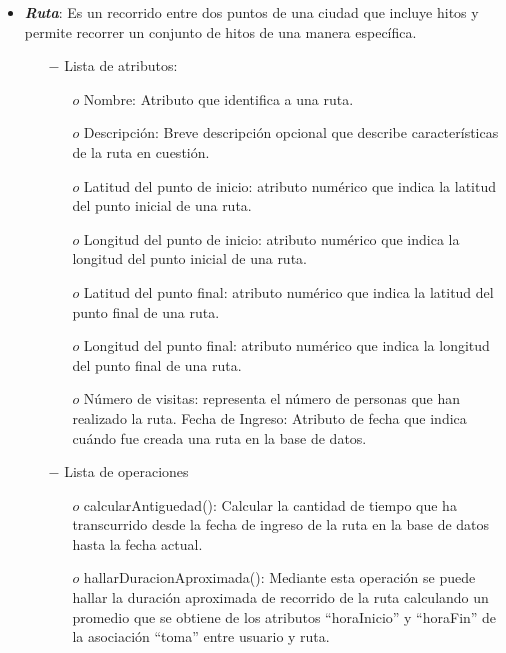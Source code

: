 \documentclass[a4paper]{article}
\begin{document}
\begin{itemize}
\item{
	\textbf{\textit{Ruta}}: Es un recorrido entre dos puntos de una ciudad que incluye hitos y permite recorrer un conjunto de hitos de una manera específica. 
  		
     \begin{itemize}   
  		\item[$-$] Lista de atributos:

	\begin{itemize}
		 
        
      \item[$o$] Nombre: Atributo que identifica a una ruta.
\item[$o$]Descripción: Breve descripción opcional que describe características de la ruta en cuestión.
\item[$o$]Latitud del punto de inicio: atributo numérico que indica la latitud del punto inicial de una ruta.
\item[$o$]Longitud del punto de inicio: atributo numérico que indica la longitud del punto inicial de una ruta.
\item[$o$]Latitud del punto final: atributo numérico que indica la latitud del punto final de una ruta.
\item[$o$]Longitud del punto final: atributo numérico que indica la longitud del punto final de una ruta.
\item[$o$]Número de visitas: representa el número de personas que han realizado la ruta.
Fecha de Ingreso: Atributo de fecha que indica cuándo fue creada una ruta en la base de datos.



	\end{itemize}


	\item[$-$] Lista de operaciones

	\begin{itemize}
		\item[$o$]  calcularAntiguedad(): Calcular la cantidad de tiempo que ha transcurrido desde la fecha de ingreso de la ruta en la base de datos hasta la fecha actual.
\item[$o$]hallarDuracionAproximada(): Mediante esta operación se puede hallar la duración aproximada de recorrido de la ruta calculando un promedio que se obtiene de los atributos “horaInicio” y “horaFin” de la asociación “toma” entre usuario y ruta.

	
	\end{itemize}




\end{itemize}}
\end{itemize}
\end{document}
